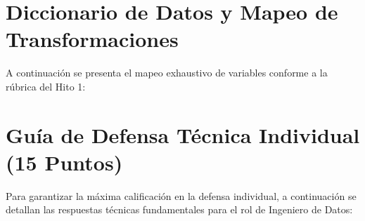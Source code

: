 \documentclass[11pt,a4paper]{article}
\begin{document}
\section{Diccionario de Datos y Mapeo de Transformaciones}
A continuación se presenta el mapeo exhaustivo de variables conforme a la rúbrica del Hito 1:



\section{Guía de Defensa Técnica Individual (15 Puntos)}
Para garantizar la máxima calificación en la defensa individual, a continuación se detallan las respuestas técnicas fundamentales para el rol de Ingeniero de Datos:
\end{document}
